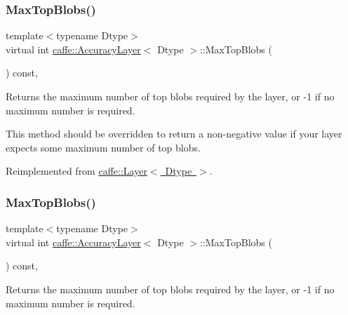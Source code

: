 \subsubsection{\texorpdfstring{Max\+Top\+Blobs()}{MaxTopBlobs()}\hspace{0.1cm}{\footnotesize\ttfamily [1/2]}}
{\footnotesize\ttfamily template$<$typename Dtype$>$ \\
virtual int \mbox{\hyperlink{classcaffe_1_1_accuracy_layer}{caffe\+::\+Accuracy\+Layer}}$<$ Dtype $>$\+::Max\+Top\+Blobs (\begin{DoxyParamCaption}{ }\end{DoxyParamCaption}) const\hspace{0.3cm}{\ttfamily [inline]}, {\ttfamily [virtual]}}



Returns the maximum number of top blobs required by the layer, or -\/1 if no maximum number is required. 

This method should be overridden to return a non-\/negative value if your layer expects some maximum number of top blobs. 

Reimplemented from \mbox{\hyperlink{classcaffe_1_1_layer_ac6c03df0b6e40e776c94001e19994a2e}{caffe\+::\+Layer$<$ Dtype $>$}}.

\mbox{\label{classcaffe_1_1_accuracy_layer_a7591ae6d50dd7d96b91241b5b0368997}} 
\subsubsection{\texorpdfstring{Max\+Top\+Blobs()}{MaxTopBlobs()}\hspace{0.1cm}{\footnotesize\ttfamily [2/2]}}
{\footnotesize\ttfamily template$<$typename Dtype$>$ \\
virtual int \mbox{\hyperlink{classcaffe_1_1_accuracy_layer}{caffe\+::\+Accuracy\+Layer}}$<$ Dtype $>$\+::Max\+Top\+Blobs (\begin{DoxyParamCaption}{ }\end{DoxyParamCaption}) const\hspace{0.3cm}{\ttfamily [inline]}, {\ttfamily [virtual]}}



Returns the maximum number of top blobs required by the layer, or -\/1 if no maximum number is required. 

